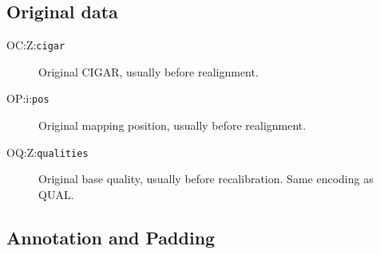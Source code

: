 \documentclass[10pt]{article}
\newcommand{\tagvalue}[1]{\tt #1}
\begin{document}
\subsection{Original data}

\begin{description}
\item[OC:Z:\tagvalue{cigar}]
Original CIGAR, usually before realignment.

\item[OP:i:\tagvalue{pos}]
Original mapping position, usually before realignment.

\item[OQ:Z:\tagvalue{qualities}]
Original base quality, usually before recalibration.
Same encoding as {\sf QUAL}.
\end{description}

\subsection{Annotation and Padding}
\end{document}
